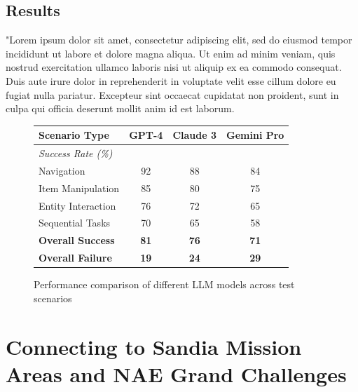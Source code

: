 \documentclass{article}
\begin{document}
\subsection{Results}
"Lorem ipsum dolor sit amet, consectetur adipiscing elit, sed do eiusmod tempor incididunt ut labore et dolore magna aliqua. Ut enim ad minim veniam, quis nostrud exercitation ullamco laboris nisi ut aliquip ex ea commodo consequat. Duis aute irure dolor in reprehenderit in voluptate velit esse cillum dolore eu fugiat nulla pariatur. Excepteur sint occaecat cupidatat non proident, sunt in culpa qui officia deserunt mollit anim id est laborum.
\begin{figure}
    \centering
    \small
    \begin{tabular}{lccc}
        \toprule
        \textbf{Scenario Type} & \textbf{GPT-4} & \textbf{Claude 3} & \textbf{Gemini Pro} \\
        \midrule
        \multicolumn{4}{l}{\textit{Success Rate (\%)}} \\
        Navigation & 92 & 88 & 84 \\
        Item Manipulation & 85 & 80 & 75 \\
        Entity Interaction & 76 & 72 & 65 \\
        Sequential Tasks & 70 & 65 & 58 \\
        \midrule
        \textbf{Overall Success} & \textbf{81} & \textbf{76} & \textbf{71} \\
        \textbf{Overall Failure} & \textbf{19} & \textbf{24} & \textbf{29} \\
        \bottomrule
    \end{tabular}
    \caption{Performance comparison of different LLM models across test scenarios}
    \label{tab:model-performance}
\end{figure}

\section{Connecting to Sandia Mission Areas and NAE Grand Challenges}
\end{document}
